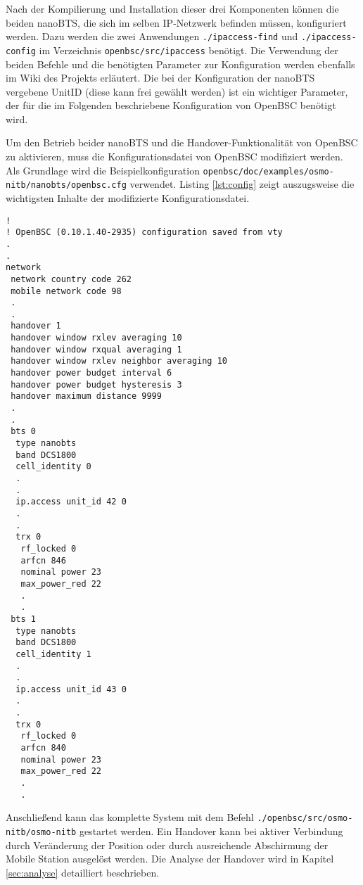 Nach der Kompilierung und Installation dieser drei Komponenten können die beiden nanoBTS, die sich im selben IP-Netzwerk befinden müssen, konfiguriert werden. Dazu werden die zwei Anwendungen \lstinline{./ipaccess-find} und \lstinline{./ipaccess-config} im Verzeichnis \lstinline{openbsc/src/ipaccess} benötigt. Die Verwendung der beiden Befehle und die benötigten Parameter zur Konfiguration werden ebenfalls im Wiki des Projekts \cite{bib:ipaccess} erläutert. Die bei der Konfiguration der nanoBTS vergebene UnitID (diese kann frei gewählt werden) ist ein wichtiger Parameter, der für die im Folgenden beschriebene Konfiguration von OpenBSC benötigt wird.

Um den Betrieb beider nanoBTS und die Handover-Funktionalität von OpenBSC zu aktivieren, muss die Konfigurationsdatei von OpenBSC modifiziert werden. Als Grundlage wird die Beispielkonfiguration \lstinline{openbsc/doc/examples/osmo-nitb/nanobts/openbsc.cfg} verwendet. Listing \ref{lst:config} zeigt auszugsweise die wichtigsten Inhalte der modifizierte Konfigurationsdatei.

\begin{lstlisting}[label=lst:config,caption=OpenBSC Konfigurationsdatei]
!
! OpenBSC (0.10.1.40-2935) configuration saved from vty
.
.
network
 network country code 262
 mobile network code 98
 .
 .
 handover 1
 handover window rxlev averaging 10
 handover window rxqual averaging 1
 handover window rxlev neighbor averaging 10
 handover power budget interval 6
 handover power budget hysteresis 3
 handover maximum distance 9999
 .
 .
 bts 0
  type nanobts
  band DCS1800
  cell_identity 0
  .
  .
  ip.access unit_id 42 0
  .
  .
  trx 0
   rf_locked 0
   arfcn 846
   nominal power 23
   max_power_red 22
   .
   .
 bts 1
  type nanobts
  band DCS1800
  cell_identity 1
  .
  .
  ip.access unit_id 43 0
  .
  .
  trx 0
   rf_locked 0
   arfcn 840
   nominal power 23
   max_power_red 22
   .
   .
\end{lstlisting}



Anschließend kann das komplette System mit dem Befehl \lstinline{./openbsc/src/osmo-nitb/osmo-nitb} gestartet werden. Ein Handover kann bei aktiver Verbindung durch Veränderung der Position oder durch ausreichende Abschirmung der Mobile Station ausgelöst werden. Die Analyse der Handover wird in Kapitel \ref{sec:analyse} detailliert beschrieben.
